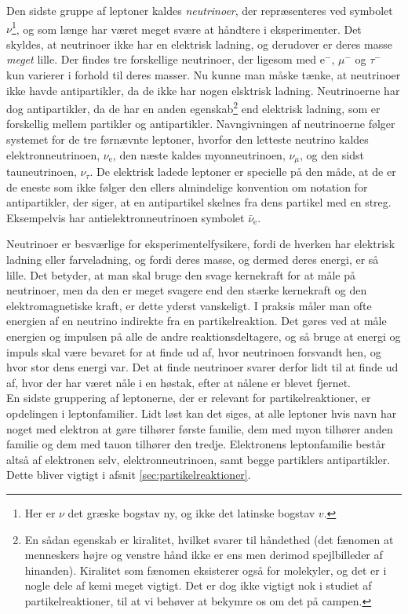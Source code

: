 Den sidste gruppe af leptoner kaldes \emph{neutrinoer}, der repræsenteres ved symbolet $\nu$\footnote{Her er $\nu$ det græske bogstav ny, og ikke det latinske bogstav $v$.}, og som længe har været meget svære at håndtere i eksperimenter. Det skyldes, at neutrinoer ikke har en elektrisk ladning, og derudover er deres masse \emph{meget} lille. Der findes tre forskellige neutrinoer, der ligesom med $\mathrm{e}^-$, $\mu^-$ og $\tau^-$ kun varierer i forhold til deres masser. Nu kunne man måske tænke, at neutrinoer ikke havde antipartikler, da de ikke har nogen elsktrisk ladning. Neutrinoerne har dog antipartikler, da de har en anden egenskab\footnote{En sådan egenskab er kiralitet, hvilket svarer til håndethed (det fænomen at menneskers højre og venstre hånd ikke er ens men derimod spejlbilleder af hinanden). Kiralitet som fænomen eksisterer også for molekyler, og det er i nogle dele af kemi meget vigtigt. Det er dog ikke vigtigt nok i studiet af partikelreaktioner, til at vi behøver at bekymre os om det på campen.} end elektrisk ladning, som er forskellig mellem partikler og antipartikler. Navngivningen af neutrinoerne følger systemet for de                 tre førnævnte leptoner, hvorfor den letteste neutrino kaldes elektronneutrinoen, $\nu_\mathrm{e}$, den næste kaldes myonneutrinoen, $\nu_\mu$, og den sidst tauneutrinoen, $\nu_\tau$. De elektrisk ladede leptoner er specielle på den måde, at de er de eneste som ikke følger den ellers almindelige konvention om notation for antipartikler, der siger, at en antipartikel skelnes fra dens partikel med en streg. Eksempelvis har antielektronneutrinoen symbolet $\bar{\nu}_\mathrm{e}$.

Neutrinoer er besværlige for eksperimentelfysikere, fordi de hverken har elektrisk ladning eller farveladning, og fordi deres masse, og dermed deres energi, er så lille. Det betyder, at man skal bruge den svage kernekraft for at måle på neutrinoer, men da den er meget svagere end den stærke kernekraft og den elektromagnetiske kraft, er dette yderst vanskeligt. I praksis måler man ofte energien af en neutrino indirekte fra en partikelreaktion. Det gøres ved at måle energien og impulsen på alle de andre reaktionsdeltagere, og så bruge at energi og impuls skal være bevaret for at finde ud af, hvor neutrinoen forsvandt hen, og hvor stor dens energi var. Det at finde neutrinoer svarer derfor lidt til at finde ud af, hvor der har været nåle i en høstak, efter at nålene er blevet fjernet.\\

En sidste gruppering af leptonerne, der er relevant for partikelreaktioner, er opdelingen i leptonfamilier. Lidt løst kan det siges, at alle leptoner hvis navn har noget med elektron at gøre tilhører første familie, dem med myon tilhører anden familie og dem med tauon tilhører den tredje. Elektronens leptonfamilie består altså af elektronen selv, elektronneutrinoen, samt begge partiklers antipartikler. Dette bliver vigtigt i afsnit \ref{sec:partikelreaktioner}.

